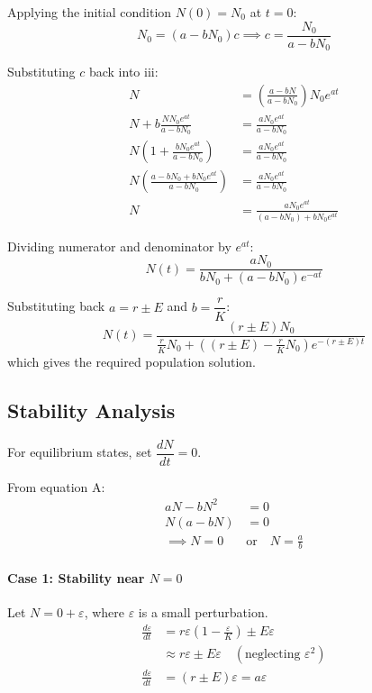 Applying the initial condition $N(0) = N_0$ at $t = 0$:
\begin{equation*}
N_0 = (a - bN_0)c \implies c = \frac{N_0}{a - bN_0}
\end{equation*}

Substituting $c$ back into iii:
\begin{align*}
N &= \left( \frac{a - bN}{a - bN_0} \right) N_0 e^{at} \\
N + b \frac{N N_0 e^{at}}{a - bN_0} &= \frac{a N_0 e^{at}}{a - bN_0} \\
N \left( 1 + \frac{b N_0 e^{at}}{a - bN_0} \right) &= \frac{a N_0 e^{at}}{a - bN_0} \\
N \left( \frac{a - bN_0 + b N_0 e^{at}}{a - bN_0} \right) &= \frac{a N_0 e^{at}}{a - bN_0} \\
N &= \frac{a N_0 e^{at}}{(a - bN_0) + b N_0 e^{at}}
\end{align*}

Dividing numerator and denominator by $e^{at}$:
\begin{equation*}
N(t) = \frac{a N_0}{b N_0 + (a - bN_0)e^{-at}}
\end{equation*}

Substituting back $a = r \pm E$ and $b = \dfrac{r}{K}$:
\begin{equation*}
N(t) = \frac{(r \pm E) N_0}{\frac{r}{K} N_0 + \left( (r \pm E) - \frac{r}{K} N_0 \right) e^{-(r \pm E)t}}
\end{equation*}
which gives the required population solution.

\subsection*{Stability Analysis}

For equilibrium states, set $\dfrac{dN}{dt} = 0$.

From equation A:
\begin{align*}
aN - bN^2 &= 0 \\
N(a - bN) &= 0 \\
\implies N = 0 \quad &\text{or} \quad N = \frac{a}{b}
\end{align*}

\paragraph{Case 1: Stability near $N = 0$}
Let $N = 0 + \varepsilon$, where $\varepsilon$ is a small perturbation.
\begin{align*}
\frac{d\varepsilon}{dt} &= r\varepsilon \left(1 - \frac{\varepsilon}{K}\right) \pm E\varepsilon \\
&\approx r\varepsilon \pm E\varepsilon \quad (\text{neglecting } \varepsilon^2) \\
\frac{d\varepsilon}{dt} &= (r \pm E)\varepsilon = a\varepsilon
\end{align*}

